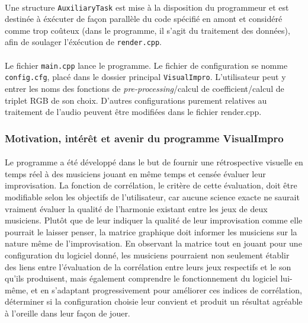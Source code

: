 \paragraph{}
Une structure \verb!AuxiliaryTask! est mise à la disposition du
programmeur et est destinée à éxécuter de façon parallèle du code spécifié
en amont et considéré comme trop coûteux (dans le programme, il s'agit du
traitement des données), afin de soulager l'éxécution de \verb!render.cpp!.

\paragraph{}
Le fichier \verb!main.cpp! lance le programme. Le fichier de
configuration se nomme \verb!config.cfg!, placé dans le dossier
principal \verb!VisualImpro!.  L'utilisateur peut y entrer les noms
des fonctions de \textit{pre-processing}/calcul de coefficient/calcul
de triplet RGB de son choix. D'autres configurations purement
relatives au traitement de l'audio peuvent être modifiées dans le
fichier render.cpp.

\subsubsection{Motivation, intérêt et avenir du programme VisualImpro}
\paragraph{}
Le programme a été développé dans le but de fournir une rétrospective
visuelle en temps réel à des musiciens jouant en même temps et censée
évaluer leur improvisation. La fonction de corrélation, le critère de
cette évaluation, doit être modifiable selon les objectifs de
l'utilisateur, car aucune science exacte ne saurait vraiment évaluer
la qualité de l'harmonie existant entre les jeux de deux
musiciens. Plutôt que de leur indiquer la qualité de leur
improvisation comme elle pourrait le laisser penser, la matrice
graphique doit informer les musiciens sur la nature même de
l'improvisation. En observant la matrice tout en jouant pour une
configuration du logiciel donné, les musiciens pourraient non
seulement établir des liens entre l'évaluation de la corrélation entre
leurs jeux respectifs et le son qu'ils produisent, mais également
comprendre le fonctionnement du logiciel lui-même, et en s'adaptant
progressivement pour améliorer ces indices de corrélation, déterminer
si la configuration choisie leur convient et produit un résultat
agréable à l'oreille dans leur façon de jouer.

